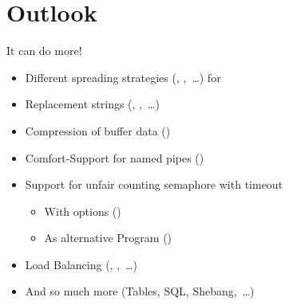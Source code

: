 \section{Outlook}
\begin{frame}{It can do more!}
\begin{itemize}[<+(1)->]
   \itemsep4pt
   \item Different spreading strategies (, ,~\ldots) for 
   \item Replacement strings (\T{\{\}}, \T{\{\%\}},~\ldots)%
   \item Compression of buffer data () %
   \item Comfort-Support for named pipes ()
   \item Support for unfair counting semaphore with timeout \begin{itemize}
      \item With options ()
      \item As alternative Program ()
   \end{itemize}
   \item Load Balancing (, ,~\ldots)
   \item And so much more (Tables, SQL, Shebang,~\ldots) %
\end{itemize}
\end{frame}
\SidebarReset
